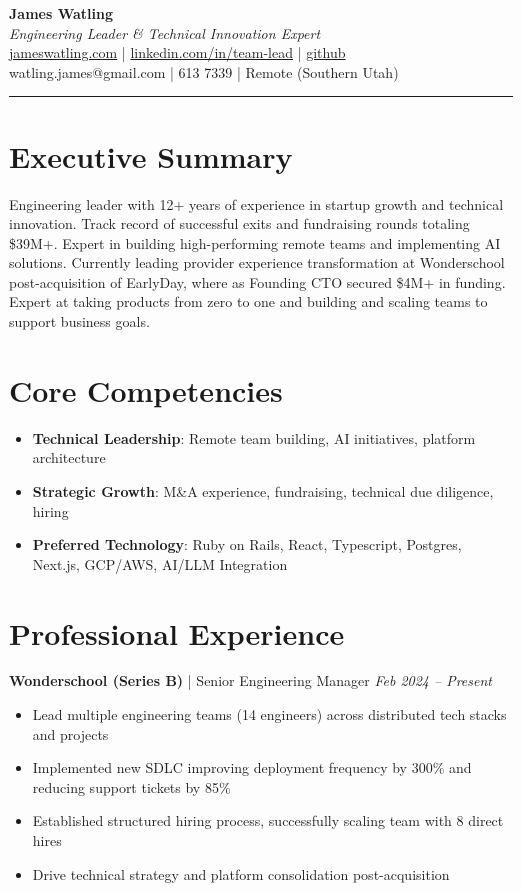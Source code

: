 \documentclass[letterpaper,10pt]{article}
\begin{document}
\begin{center}
    {\huge \textbf{James Watling}}\\[5pt]
    \textit{Engineering Leader \& Technical Innovation Expert}\\[5pt]
    \href{https://jameswatling.com}{jameswatling.com} \quad | \quad
    \href{https://www.linkedin.com/in/team-lead/}{linkedin.com/in/team-lead} \quad | \quad
    \href{https://github.com/JamesWatling/}{github}\\[3pt]
    watling.james@gmail.com \quad |  613 7339 \quad | \quad Remote (Southern Utah)
\end{center}


\hrule

\section*{Executive Summary}
Engineering leader with 12+ years of experience in startup growth and technical innovation. Track record of successful exits and fundraising rounds totaling \$39M+. Expert in building high-performing remote teams and implementing AI solutions. Currently leading provider experience transformation at Wonderschool post-acquisition of EarlyDay, where as Founding CTO secured \$4M+ in funding. Expert at taking products from zero to one and building and scaling teams to support business goals.

\section*{Core Competencies}
\begin{itemize}[leftmargin=*, nosep]
    \item \textbf{Technical Leadership}: Remote team building, AI initiatives, platform architecture
    \item \textbf{Strategic Growth}: M\&A experience, fundraising, technical due diligence, hiring
    \item \textbf{Preferred Technology}: Ruby on Rails, React, Typescript, Postgres, Next.js, GCP/AWS, AI/LLM Integration
\end{itemize}

\section*{Professional Experience}

\textbf{Wonderschool (Series B)} | Senior Engineering Manager \hfill \textit{Feb 2024 -- Present}
\begin{itemize}[leftmargin=*, nosep]
    \item Lead multiple engineering teams (14 engineers) across distributed tech stacks and projects
    \item Implemented new SDLC improving deployment frequency by 300\% and reducing support tickets by 85\%
    \item Established structured hiring process, successfully scaling team with 8 direct hires
    \item Drive technical strategy and platform consolidation post-acquisition
\end{itemize}
\end{document}
